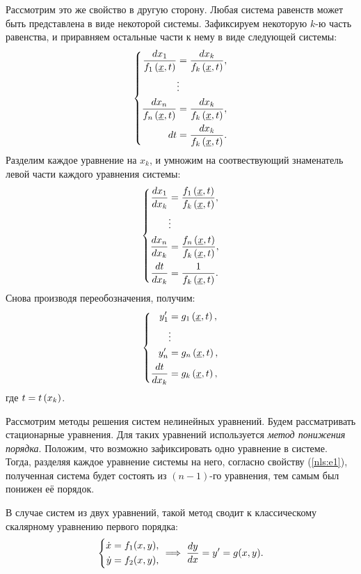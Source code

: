 	Рассмотрим это же свойство в другую сторону. Любая система равенств может быть представлена в виде некоторой системы. Зафиксируем некоторую $k$-ю часть равенства, и приравняем остальные части к нему в виде следующей системы:
	\[ \left\lbrace \begin{split} 
		\frac{dx_1}{f_1\left( \underline{x}, t \right)} &= \frac{dx_k}{f_k\left( \underline{x}, t \right)}, \\
		&\vdots \\
		\frac{dx_n}{f_n\left( \underline{x}, t \right)} &= \frac{dx_k}{f_k\left( \underline{x}, t \right)}, \\
		dt &= \frac{dx_k}{f_k\left( \underline{x}, t \right)}.
	\end{split} \right. \]
	Разделим каждое уравнение на $x_k$, и умножим на соотвествующий знаменатель левой части каждого уравнения системы:
	\[ \left\lbrace \begin{split} 
		\frac{dx_1}{dx_k} &= \frac{f_1\left( \underline{x}, t \right)}{f_k\left( \underline{x}, t \right)}, \\
		&\vdots \\
		\frac{dx_n}{dx_k} &= \frac{f_n\left( \underline{x}, t \right)}{f_k\left( \underline{x}, t \right)}, \\
		\frac{dt}{dx_k} &= \frac{1}{f_k\left( \underline{x}, t \right)}.
	\end{split} \right. \]
	Снова производя переобозначения, получим:
	\[ \left\lbrace \begin{split} 
		y'_1 &= g_1\left( \underline{x}, t \right), \\
		&\vdots \\
		y'_n &= g_n\left( \underline{x}, t \right), \\
		\frac{dt}{dx_k} &= g_k\left( \underline{x}, t \right),
	\end{split} \right. \]
	где $t = t\left( x_k \right)$.

	Рассмотрим методы решения систем нелинейных уравнений. Будем рассматривать стационарные уравнения. Для таких уравнений используется \textit{метод понижения порядка}. Положим, что возможно зафиксировать одно уравнение в системе. Тогда, разделяя каждое уравнение системы на него, согласно свойству (\ref{nls:e1}), полученная система будет состоять из $(n-1)$-го уравнения, тем самым был понижен её порядок.

	В случае систем из двух уравнений, такой метод сводит к классическому скалярному уравнению первого порядка:
	\[ \left\lbrace \begin{split} 
		\dot{x} &= f_1(x, y), \\
		\dot{y} &= f_2(x, y),
	\end{split} \right. \implies \dfrac{d y}{d x} = y' = g(x, y). \]

